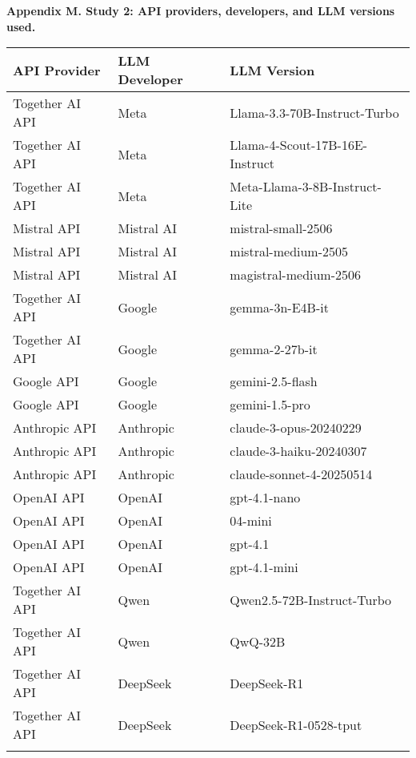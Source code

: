 \documentclass[11pt]{article}
\begin{document}
\noindent\hspace*{1cm}\textbf{\large Appendix M. Study 2: API providers, developers, and LLM versions used.}

\vspace{1em}

{\small
\renewcommand{\arraystretch}{1.2}
\begin{tabular}{p{4cm} p{3.5cm} p{6.5cm}}
\toprule
\textbf{API Provider} & \textbf{LLM Developer} & \textbf{LLM Version} \\
\midrule
Together AI API & Meta & Llama-3.3-70B-Instruct-Turbo \\
\addlinespace[0.7em]
Together AI API & Meta & Llama-4-Scout-17B-16E-Instruct \\
\addlinespace[0.7em]
Together AI API & Meta & Meta-Llama-3-8B-Instruct-Lite \\
\addlinespace[0.7em]
\addlinespace[1.0em]
Mistral API & Mistral AI & mistral-small-2506 \\
\addlinespace[0.7em]
Mistral API & Mistral AI & mistral-medium-2505 \\
\addlinespace[0.7em]
Mistral API & Mistral AI & magistral-medium-2506 \\
\addlinespace[0.7em]
\addlinespace[1.0em]
Together AI API & Google & gemma-3n-E4B-it \\
\addlinespace[0.7em]
Together AI API & Google & gemma-2-27b-it \\
\addlinespace[0.7em]
Google API & Google & gemini-2.5-flash \\
\addlinespace[0.7em]
Google API & Google & gemini-1.5-pro \\
\addlinespace[0.7em]
\addlinespace[1.0em]
Anthropic API & Anthropic & claude-3-opus-20240229 \\
\addlinespace[0.7em]
Anthropic API & Anthropic & claude-3-haiku-20240307 \\
\addlinespace[0.7em]
Anthropic API & Anthropic & claude-sonnet-4-20250514 \\
\addlinespace[0.7em]
\addlinespace[1.0em]
OpenAI API & OpenAI & gpt-4.1-nano \\
\addlinespace[0.7em]
OpenAI API & OpenAI & 04-mini \\
\addlinespace[0.7em]
OpenAI API & OpenAI & gpt-4.1 \\
\addlinespace[0.7em]
OpenAI API & OpenAI & gpt-4.1-mini \\
\addlinespace[0.7em]
\addlinespace[1.0em]
Together AI API & Qwen & Qwen2.5-72B-Instruct-Turbo \\
\addlinespace[0.7em]
Together AI API & Qwen & QwQ-32B \\
\addlinespace[0.7em]
\addlinespace[1.0em]
Together AI API & DeepSeek & DeepSeek-R1 \\
\addlinespace[0.7em]
Together AI API & DeepSeek & DeepSeek-R1-0528-tput \\
\addlinespace[0.7em]
\bottomrule
\end{tabular}
}
\end{document}
